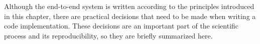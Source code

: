 
Although the end-to-end system is written according to the
principles introduced in this chapter, there are practical
decisions that need to be made when writing a code
implementation. These decisions are an important part of the
scientific process and its reproducibility, so they are
briefly summarized here.
